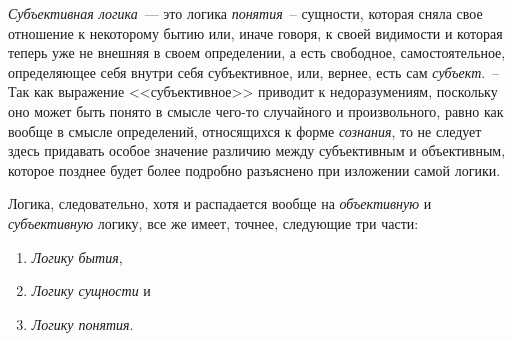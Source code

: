 
\emph{Субъективная логика}~--- это логика \emph{понятия}~-- сущности,
которая сняла свое отношение к некоторому бытию
или, иначе говоря, к своей видимости и которая теперь
уже не внешняя в своем определении, а есть свободное,
самостоятельное, определяющее себя внутри себя
субъективное, или, вернее, есть сам \emph{субъект}.~-- Так как
выражение <<субъективное>> приводит к недоразумениям,
поскольку оно может быть понято в смысле чего-то случайного
и произвольного, равно как вообще в смысле
определений, относящихся к форме \emph{сознания}, то не следует
здесь придавать особое значение различию между
субъективным и объективным, которое позднее будет более
подробно разъяснено при изложении самой логики.

Логика, следовательно, хотя и распадается вообще на
\emph{объективную} и \emph{субъективную} логику, все же имеет, точнее,
следующие три части:
\begin{enumerate}[label=\Roman*.]
\item \emph{Логику бытия},
\item \emph{Логику сущности} и
\item \emph{Логику понятия}.
\end{enumerate}


